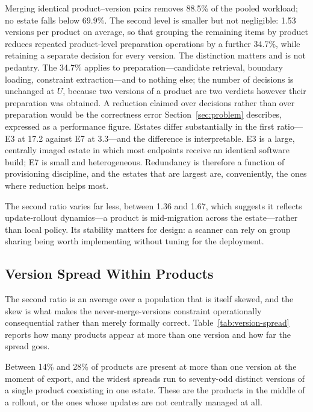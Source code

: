 \documentclass[fleqn,10pt,lineno]{wlpeerj}
\begin{document}
Merging identical product--version pairs removes 88.5\% of the pooled workload; no estate falls below 69.9\%. The second level is smaller but not negligible: 1.53 versions per product on average, so that grouping the remaining items by product reduces repeated product-level preparation operations by a further 34.7\%, while retaining a separate decision for every version. The distinction matters and is not pedantry. The 34.7\% applies to preparation---candidate retrieval, boundary loading, constraint extraction---and to nothing else; the number of decisions is unchanged at $U$, because two versions of a product are two verdicts however their preparation was obtained. A reduction claimed over decisions rather than over preparation would be the correctness error Section~\ref{sec:problem} describes, expressed as a performance figure. Estates differ substantially in the first ratio---E3 at 17.2 against E7 at 3.3---and the difference is interpretable. E3 is a large, centrally imaged estate in which most endpoints receive an identical software build; E7 is small and heterogeneous. Redundancy is therefore a function of provisioning discipline, and the estates that are largest are, conveniently, the ones where reduction helps most.

The second ratio varies far less, between 1.36 and 1.67, which suggests it reflects update-rollout dynamics---a product is mid-migration across the estate---rather than local policy. Its stability matters for design: a scanner can rely on group sharing being worth implementing without tuning for the deployment.

\subsection{Version Spread Within Products}
The second ratio is an average over a population that is itself skewed, and the skew is what makes the never-merge-versions constraint operationally consequential rather than merely formally correct. Table~\ref{tab:version-spread} reports how many products appear at more than one version and how far the spread goes.



Between 14\% and 28\% of products are present at more than one version at the moment of export, and the widest spreads run to seventy-odd distinct versions of a single product coexisting in one estate. These are the products in the middle of a rollout, or the ones whose updates are not centrally managed at all.
\end{document}

